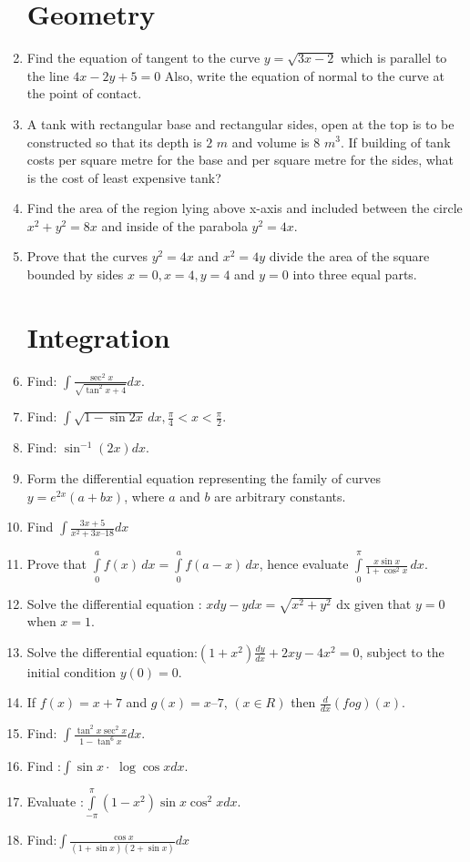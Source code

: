 \documentclass{article}
\begin{document}
\begin{enumerate}
\section{Geometry}
\item Find the equation of tangent to the curve $y=\sqrt{3x-2}$ which is parallel to the line $4x-2y+5=0$ Also, write the equation of normal to the curve at the point of contact.
\item A tank with rectangular base and rectangular sides, open at the top is to be constructed so that its depth is $2$ $m$ and volume is 8 $m^3$. If building of tank costs  per square metre for the base and  per square metre for the sides, what is the cost of least expensive tank? 
\item Find the area of the region lying above x-axis and included between the circle $x^2 + y^2 = 8x$  and inside of the parabola $y^2 = 4x$.
\item Prove that the curves $y^2 = 4x$ and $x^2 = 4y$ divide the area of the square bounded by sides $x = 0, x = 4, y = 4$ and $y = 0$ into three equal parts. 
\section{Integration}
\item  Find: $\int\frac{\sec^2x}{\sqrt{\tan^2x+4}}dx$.
\item Find: $\int \sqrt{1-\sin 2x} \, dx, \frac{\pi}{4} < x < \frac{\pi}{2}$.
\item Find: ${\sin^{-1}(2x)} dx$.
\item Form the differential equation representing the family of curves $y = e^{2x}(a + bx)$, where $a$ and $b$ are arbitrary constants.
\item  Find $\int \frac{3x + 5}{x^2+ 3x – 18}dx$
\item Prove that $\int\limits_{0}^{a} f(x) \,dx = \int\limits_{0}^{a} f(a-x) \,dx$, hence evaluate $\int\limits_{0}^{\pi} \frac{x\sin x}{1 + \cos^2 x} \, dx$.
\item Solve the differential equation : $x dy-y dx = \sqrt{x^2+y^2} $ dx given that $y=0$ when $x=1$.
\item Solve the differential equation:$(1+x^2)\frac{dy}{dx}+2xy-4x^2=0$, subject to the initial condition $y(0)=0$.
\item If $f(x) = x + 7$ and $g(x) = x – 7$, $(x\in R)$ then  $\frac{d}{dx}(fog)(x)$.
\item Find: $\int\frac{\tan^2x\sec^2x}{1-\tan^6x} dx$.
\item Find :$\int \sin x\cdot$ $\log\cos x dx$.
\item Evaluate :$\int\limits_{-\pi}^{\pi}(1-x^2)\sin x \cos^2xdx$.
\item Find:$\int\frac{\cos x}{(1 + \sin x)(2 + \sin x)} dx$

\end{enumerate}
\end{document}
